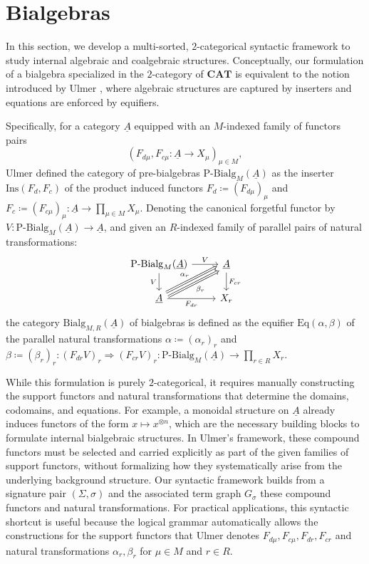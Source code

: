 \documentclass[11pt]{article}
\theoremstyle{plain}
\theoremstyle{definition}
\numberwithin{equation}{section}
\newcommand{\CAT}{\mathbf{CAT}}
\newcommand{\Ins}{\mathrm{Ins}}
\newcommand{\Eq}{\mathrm{Eq}}
\begin{document}
\section{Bialgebras}

In this section, we develop a multi-sorted, $2$-categorical syntactic framework to study internal algebraic and coalgebraic structures. Conceptually, our formulation of a bialgebra specialized in the $2$-category of $\CAT$ is equivalent to the notion introduced by Ulmer \cite{Ulmer1977Bialgebras}, where algebraic structures are captured by inserters and equations are enforced by equifiers. 

Specifically, for a category $\underline{A}$ equipped with an $M$-indexed family of functors pairs
$$
(F_{d\mu},F_{c\mu}\colon \underline{A}\to X_\mu)_{\mu\in M},
$$
Ulmer defined the category of pre-bialgebras $\mathrm{P\text{-}Bialg}_M(\underline{A})$ as the inserter $\Ins(F_d,F_c)$ of the product induced functors $F_d\coloneqq (F_{d\mu})_\mu$ and $F_c\coloneqq (F_{c\mu})_\mu \colon \underline{A}\to \prod_{\mu\in M} X_\mu$. Denoting the canonical forgetful functor by $V\colon \mathrm{P\text{-}Bialg}_M(\underline{A})\to \underline{A}$, and given an $R$-indexed family of parallel pairs of natural transformations:
$$
\begin{tikzcd}
\mathrm{P\text{-}Bialg}_M(\underline{A}) \arrow[d, "V"'] \arrow[r, "V"]                                                           & \underline{A} \arrow[d, "F_{cr}"] \\
\underline{A} \arrow[r, "F_{dr}"'] \arrow[ru, "\alpha_r", Rightarrow, shift left] \arrow[ru, "\beta_r"', Rightarrow, shift right] & X_r                              
\end{tikzcd}
$$ 
the category $\mathrm{Bialg}_{M,R}(\underline{A})$ of bialgebras is defined as the equifier $\Eq(\alpha,\beta)$ of the parallel natural transformations $\alpha\coloneqq (\alpha_r)_r$ and $\beta\coloneqq (\beta_r)_r\colon (F_{dr} V)_r\Rightarrow (F_{cr}V)_r\colon \mathrm{P\text{-}Bialg}_M(\underline{A})\to \prod_{r\in R}X_r$.

While this formulation is purely $2$-categorical, it requires manually constructing the support functors and natural transformations that determine the domains, codomains, and equations. For example, a monoidal structure on $\underline{A}$ already induces functors of the form $x \mapsto x^{\otimes n}$, which are the necessary building blocks to formulate internal bialgebraic structures. In Ulmer's framework, these compound functors must be selected and carried explicitly as part of the given families of support functors, without formalizing how they systematically arise from the underlying background structure. Our syntactic framework builds from a signature pair $(\Sigma, \sigma)$ and the associated term graph $G_\sigma$ these compound functors and natural transformations. For practical applications, this syntactic shortcut is useful because the logical grammar automatically allows the constructions for the support functors that Ulmer denotes $F_{d\mu},F_{c\mu}, F_{dr},F_{cr}$ and natural transformations $\alpha_r,\beta_r$ for $\mu\in M$ and $r\in R$.
\end{document}

